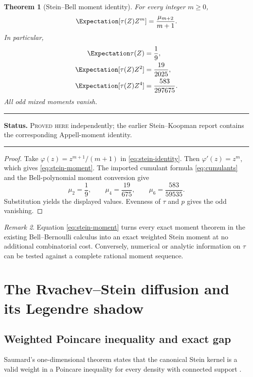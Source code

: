 \documentclass[11pt,oneside]{article}
\newtheorem{theorem}{Theorem}[section]
\theoremstyle{definition}
\theoremstyle{remark}
\newtheorem{remark}[theorem]{Remark}
\newenvironment{boxedremark}{%
  \par\smallskip\noindent\begin{center}\begin{minipage}{0.94\textwidth}%
  \color{black}\hrule\vspace{0.6em}\small
}{%
  \vspace{0.6em}\hrule\end{minipage}\end{center}\smallskip
}
\newcommand{\ProvedHere}{\textsc{Proved here}}
\newcommand{\Status}[1]{%
  \begin{boxedremark}\textbf{Status.} #1.\end{boxedremark}}
\begin{document}
\begin{theorem}[Stein--Bell moment identity]\label{thm:stein-bell}
For every integer $m\ge0$,
\begin{equation}\label{eq:stein-moment}
 \Expectation[\tau(Z)Z^m]=\frac{\mu_{m+2}}{m+1}.
\end{equation}
In particular,
\begin{align}
 \Expectation\tau(Z)&=\frac19,\label{eq:Etau}\\
 \Expectation[\tau(Z)Z^2]&=\frac{19}{2025},\label{eq:EtauZ2}\\
 \Expectation[\tau(Z)Z^4]&=\frac{583}{297675}.
 \label{eq:EtauZ4}
\end{align}
All odd mixed moments vanish.
\end{theorem}
\Status{\ProvedHere{} independently; the earlier Stein--Koopman report contains
the corresponding Appell-moment identity}

\begin{proof}
Take $\varphi(z)=z^{m+1}/(m+1)$ in \eqref{eq:stein-identity}.  Then
$\varphi'(z)=z^m$, which gives \eqref{eq:stein-moment}.  The imported cumulant
formula \eqref{eq:cumulants} and the Bell-polynomial moment conversion give
\[
 \mu_2=\frac19,
 \qquad \mu_4=\frac{19}{675},
 \qquad \mu_6=\frac{583}{59535}.
\]
Substitution yields the displayed values.  Evenness of $\tau$ and $p$ gives the
odd vanishing.
\end{proof}

\begin{remark}
Equation \eqref{eq:stein-moment} turns every exact moment theorem in the existing
Bell--Bernoulli calculus into an exact weighted Stein moment at no additional
combinatorial cost.  Conversely, numerical or analytic information on $\tau$ can
be tested against a complete rational moment sequence.
\end{remark}

\section{The Rvachev--Stein diffusion and its Legendre shadow}

\subsection{Weighted Poincare inequality and exact gap}
Saumard's one-dimensional theorem states that the canonical Stein kernel is a
valid weight in a Poincare inequality for every density with connected support
\cite{saumard}.
\end{document}
